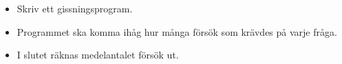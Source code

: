 \mode*

\begin{frame}
  \begin{exercise}
    \begin{itemize}
      \item Skriv ett gissningsprogram.
      \item Programmet ska komma ihåg hur många försök som krävdes på varje 
        fråga.
      \item I slutet räknas medelantalet försök ut.
    \end{itemize}
  \end{exercise}
\end{frame}

